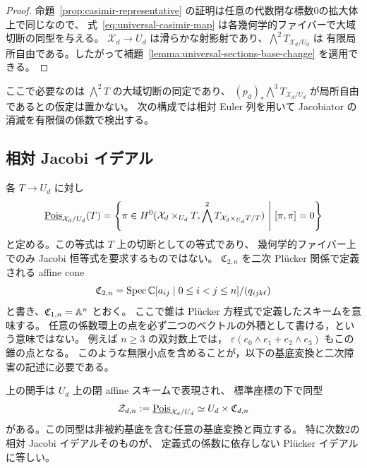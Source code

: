 \begin{proof}
命題~\ref{prop:casimir-representative} の証明は任意の代数閉な標数0の拡大体上で同じなので、
式~\eqref{eq:universal-casimir-map} は各幾何学的ファイバーで大域切断の同型を与える。
$\mathcal X_d\to U_d$ は滑らかな射影射であり、$\bigwedge^2T_{\mathcal X_d/U_d}$ は
有限局所自由である。したがって補題~\ref{lemma:universal-sections-base-change} を適用できる。
\end{proof}

ここで必要なのは $\bigwedge^2T$ の大域切断の同定であり、
$(p_d)_*\bigwedge^3T_{\mathcal X_d/U_d}$ が局所自由であるとの仮定は置かない。
次の構成では相対 Euler 列を用いて Jacobiator の消滅を有限個の係数で検出する。

\subsection{相対 Jacobi イデアル}

各 $T\to U_d$ に対し
\[
 \underline{\operatorname{Pois}}_{\mathcal X_d/U_d}(T)=
 \left\{\pi\in H^0(\mathcal X_d\times_{U_d}T,
                 \bigwedge^2T_{\mathcal X_d\times_{U_d}T/T})
                \ \middle|\ [\pi,\pi]=0\right\}
\]
と定める。この等式は $T$ 上の切断としての等式であり、
幾何学的ファイバー上でのみ Jacobi 恒等式を要求するものではない。
$\mathfrak C_{2,n}$ を二次 Pl\"ucker 関係で定義される affine cone
\[
 \mathfrak C_{2,n}=
 \operatorname{Spec}\mathbb C[a_{ij}\mid0\leq i<j\leq n]/(q_{ijk\ell})
\]
と書き、$\mathfrak C_{1,n}=\mathbb A^n$ とおく。
ここで錐は Pl\"ucker 方程式で定義したスキームを意味する。
任意の係数環上の点を必ず二つのベクトルの外積として書ける，という意味ではない。
例えば $n\geq3$ の双対数上では，
$\varepsilon(e_0\wedge e_1+e_2\wedge e_3)$ もこの錐の点となる。
このような無限小点を含めることが，以下の基底変換と二次障害の記述に必要である。

\begin{theorem}
\label{thm:relative-poisson}
上の関手は $U_d$ 上の閉 affine スキームで表現され、
標準座標の下で同型
\begin{equation}
 \mathcal Z_{d,n}:=\underline{\operatorname{Pois}}_{\mathcal X_d/U_d}
 \simeq U_d\times\mathfrak C_{d,n}
 \label{eq:relative-poisson-product}
\end{equation}
がある。この同型は非被約基底を含む任意の基底変換と両立する。
特に次数2の相対 Jacobi イデアルそのものが、
定義式の係数に依存しない Pl\"ucker イデアルに等しい。
\end{theorem}

